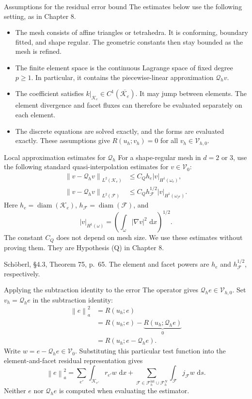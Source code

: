 \documentclass[11pt,aspectratio=169]{beamer}
\newcommand{\dd}{\,\mathrm{d}}
\newcommand{\Fh}{\mathcal F_h}
\newcommand{\Vzero}{\mathcal V_0}
\newcommand{\Vhzero}{\mathcal V_{h,0}}
\newcommand{\Qh}{\mathcal Q_h}
\newcommand{\norm}[2][]{\left\lVert#2\right\rVert_{#1}}
\newcommand{\seminorm}[2][]{\left\lvert#2\right\rvert_{#1}}
\newcommand{\grad}{\nabla}
\begin{document}
\begin{frame}{Assumptions for the residual error bound}
The estimates below use the following setting, as in Chapter 8.
\begin{itemize}
 \item The mesh consists of affine triangles or tetrahedra. It is
 conforming, boundary fitted, and shape regular. The geometric constants
 then stay bounded as the mesh is refined.
 \item The finite element space is the continuous Lagrange space of fixed
 degree $p\geq1$. In particular, it contains the piecewise-linear
 approximation $\Qh v$.
 \item The coefficient satisfies
 $k|_{\mathcal K_e}\in C^1(\overline{\mathcal K_e})$.
 It may jump between elements. The element divergence and facet fluxes
 can therefore be evaluated separately on each element.
 \item The discrete equations are solved exactly, and the forms are
 evaluated exactly. These assumptions give $R(u_h;v_h)=0$ for all
 $v_h\in\Vhzero$.
\end{itemize}
\end{frame}

\begin{frame}{Local approximation estimates for $\Qh$}
For a shape-regular mesh in $d=2$ or $3$, use the following standard
quasi-interpolation estimates for $v\in\Vzero$:
\[
\boxed{\begin{aligned}
 \norm[L^2(\mathcal K_e)]{v-\Qh v}
 &\leq C_Q h_e\seminorm[H^1(\omega_e)]{v},\\[3pt]
 \norm[L^2(\mathcal F)]{v-\Qh v}
 &\leq C_Q h_{\mathcal F}^{1/2}
              \seminorm[H^1(\omega_{\mathcal F})]{v}.
\end{aligned}}
\]
Here $h_e=\operatorname{diam}(\mathcal K_e)$,
$h_{\mathcal F}=\operatorname{diam}(\mathcal F)$, and
\[
 \seminorm[H^1(\omega)]{v}
 =\left(\int_\omega|\grad v|^2\,\dd x\right)^{1/2}.
\]
The constant $C_Q$ does not depend on mesh size. We use these estimates
without proving them. They are Hypothesis (Q) in Chapter 8.

\vspace{0.12cm}
{\footnotesize Sch\"oberl, \S4.3, Theorem 75, p.~65. The element and facet
powers are $h_e$ and $h_{\mathcal F}^{1/2}$, respectively.}
\end{frame}

\begin{frame}{Applying the subtraction identity to the error}
The operator gives $\Qh e\in\Vhzero$. Set $v_h=\Qh e$ in
the subtraction identity:
\[
\begin{aligned}
 \norm[a]{e}^2
 &=R(u_h;e)\\
 &=R(u_h;e)-\underbrace{R(u_h;\Qh e)}_{0}\\
 &=R(u_h;e-\Qh e).
\end{aligned}
\]
Write $w=e-\Qh e\in\Vzero$. Substituting this particular test function into the
element-and-facet residual representation gives
\[
 \boxed{\norm[a]{e}^2
 =\sum_{e'}\int_{\mathcal K_{e'}}r_{e'}w\,\dd x
 +\sum_{\mathcal F\in\Fh^{\mathrm{int}}\cup\Fh^N}
            \int_{\mathcal F}j_{\mathcal F}w\,\dd s.}
\]
Neither $e$ nor $\Qh e$ is computed when evaluating the estimator.
\end{frame}
\end{document}
